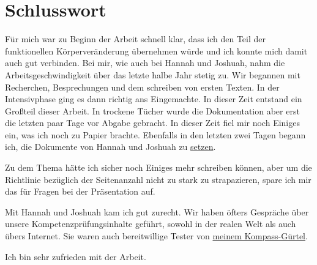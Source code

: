 \section{Schlusswort}
Für mich war zu Beginn der Arbeit schnell klar, dass ich den Teil der funktionellen Körperveränderung
übernehmen würde und ich konnte mich damit auch gut verbinden. Bei mir, wie auch bei Hannah und
Joshuah, nahm die Arbeitsgeschwindigkeit über das letzte halbe Jahr stetig zu. Wir begannen mit
Recherchen, Besprechungen und dem schreiben von ersten Texten. In der Intensivphase ging es dann
richtig ans Eingemachte. In dieser Zeit entstand ein Großteil dieser Arbeit. In trockene Tücher wurde
die Dokumentation aber erst die letzten paar Tage vor Abgabe gebracht. In dieser Zeit fiel mir noch
Einiges ein, was ich noch zu Papier brachte. Ebenfalls in den letzten zwei Tagen begann ich,
die Dokumente von Hannah und Joshuah zu
\href{http://de.wikipedia.org/wiki/Satz_(Druck)}{setzen}.

Zu dem Thema hätte ich sicher noch Einiges mehr schreiben können, aber um die Richtlinie bezüglich
der Seitenanzahl nicht zu stark zu strapazieren, spare ich mir das für Fragen bei der Präsentation
auf.

Mit Hannah und Joshuah kam ich gut zurecht. Wir haben öfters Gespräche über unsere
Kompetenzprüfungsinhalte geführt, sowohl in der realen Welt als auch übers Internet. Sie waren auch
bereitwillige Tester von \hyperref[sec:Robin:experiments:myCompassBelt]{meinem Kompass-Gürtel}.

Ich bin sehr zufrieden mit der Arbeit.
